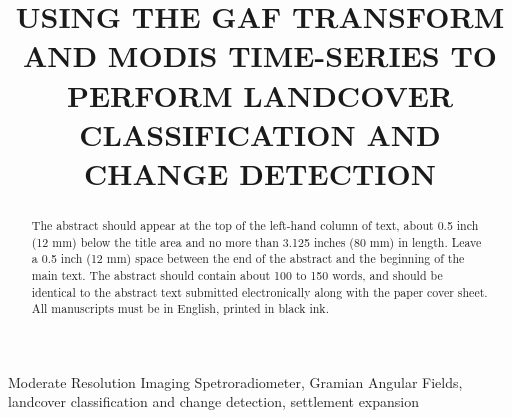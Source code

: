 \documentclass{article}
\title{USING THE GAF TRANSFORM AND MODIS TIME-SERIES TO PERFORM LANDCOVER CLASSIFICATION AND CHANGE DETECTION}
\begin{document}
%
\maketitle
%
\begin{abstract}
The abstract should appear at the top of the left-hand column of text, about
0.5 inch (12 mm) below the title area and no more than 3.125 inches (80 mm) in
length.  Leave a 0.5 inch (12 mm) space between the end of the abstract and the
beginning of the main text.  The abstract should contain about 100 to 150
words, and should be identical to the abstract text submitted electronically
along with the paper cover sheet.  All manuscripts must be in English, printed
in black ink.
\end{abstract}
%
\begin{keywords}
Moderate Resolution Imaging Spetroradiometer, Gramian Angular Fields, landcover classification and change detection, settlement expansion
\end{keywords}
%
\end{document}
